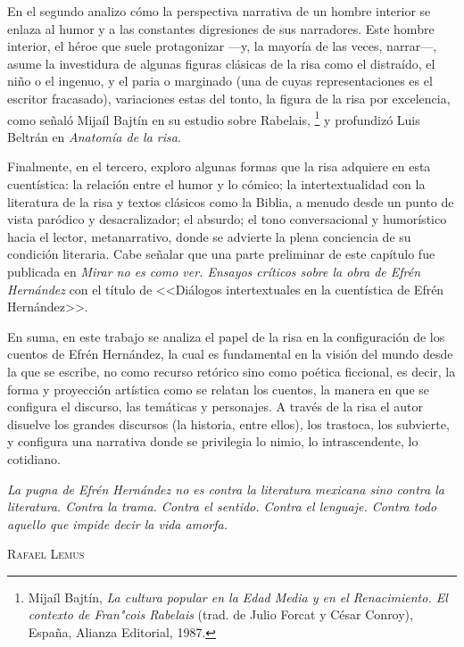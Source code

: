 \documentclass[14pt,twoside,final]{extbook} %
\let\oldfootnote\footnote
\renewcommand\footnote[1]{%
\oldfootnote{\hspace{1mm}#1}}
\begin{document}
En el segundo analizo cómo la perspectiva narrativa de un hombre interior se enlaza al humor y a las constantes digresiones de sus narradores. Este hombre interior, el héroe que suele protagonizar ---y, la mayoría de las veces, narrar---, asume la investidura de algunas figuras clásicas de la risa como el distraído, el niño o el ingenuo, y el paria o marginado (una de cuyas representaciones es el escritor fracasado), variaciones estas del tonto, la figura de la risa por excelencia, como
señaló Mijaíl Bajtín en su estudio sobre Rabelais,\footnote{Mijaíl Bajtín, \emph{La cultura popular en la Edad Media y en el Renacimiento. El contexto de Fran"cois Rabelais} (trad. de Julio Forcat y César Conroy), España, Alianza Editorial, 1987.} y profundizó Luis Beltrán en \emph{Anatomía de la risa}.

Finalmente, en el tercero, exploro algunas formas que la risa adquiere en esta cuentística: la relación entre el humor y lo cómico; la intertextualidad con la literatura de la risa y textos clásicos como la Biblia, a menudo desde un punto de vista paródico y desacralizador; el absurdo; el tono conversacional y humorístico hacia el lector, metanarrativo, donde se advierte la plena conciencia de su condición literaria. Cabe señalar que una parte preliminar de este capítulo fue publicada en \emph{Mirar no es como ver. Ensayos críticos sobre la obra de Efrén Hernández} con el título de <<Diálogos intertextuales en la cuentística de Efrén Hernández>>.

En suma, en este trabajo se analiza el papel de la risa en la configuración de los cuentos de Efrén Hernández, la cual es fundamental en la visión del mundo desde la que se escribe, no como recurso retórico sino como poética ficcional, es decir, la forma y proyección artística como se relatan los cuentos, la manera en que se configura el discurso, las temáticas y personajes. A través de la risa el autor disuelve los grandes discursos (la historia, entre ellos), los trastoca, los subvierte, y configura una narrativa donde se privilegia lo nimio, lo intrascendente, lo cotidiano.
\newpage
\pagestyle{empty}
\null\vfill
\newpage
\pagestyle{empty}
\vspace*{42pt}
\begin{flushright}
\begin{minipage}{7.5cm}
\emph{La pugna de Efrén Hernández no es contra la literatura mexicana sino contra la literatura. Contra la trama. Contra el sentido. Contra el lenguaje. Contra todo aquello que impide decir la vida amorfa.}
\begin{flushright}
\textsc{Rafael Lemus}
\end{flushright}
\end{minipage}
\end{flushright}
\newpage
\pagestyle{empty}
\AddToShipoutPictureBG*{%
\AtPageLowerLeft{\texttt{[image: eh2]}} %
}
\null\vfill
\end{document}
